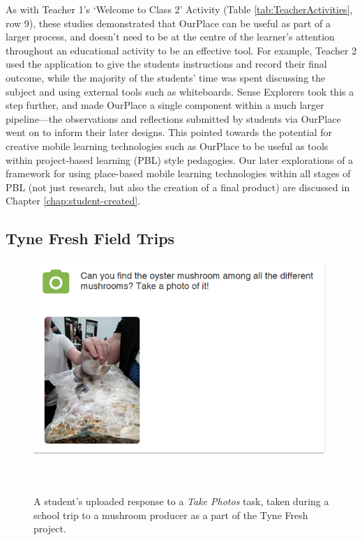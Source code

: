 As with Teacher 1's `Welcome to Class 2' Activity (Table \ref{tab:TeacherActivities}, row 9), these studies demonstrated that OurPlace can be useful as part of a larger process, and doesn't need to be at the centre of the learner's attention throughout an educational activity to be an effective tool. For example, Teacher 2 used the application to give the students instructions and record their final outcome, while the majority of the students' time was spent discussing the subject and using external tools such as whiteboards. Sense Explorers took this a step further, and made OurPlace a single component within a much larger pipeline---the observations and reflections submitted by students via OurPlace went on to inform their later designs. This pointed towards the potential for creative mobile learning technologies such as OurPlace to be useful as tools within project-based learning (PBL) style pedagogies. Our later explorations of a framework for using place-based mobile learning technologies within all stages of PBL (not just research, but also the creation of a final product) are discussed in Chapter \ref{chap:student-created}.

\subsection{Tyne Fresh Field Trips}
\label{sec:TyneFresh}

\begin{figure}
  \centering
  \includegraphics[width=0.8\columnwidth]{images/chapter07/mushroom.png}
  \caption[A student's uploaded photo from a visit to a mushroom producer]{A student's uploaded response to a \textit{Take Photos} task, taken during a school trip to a mushroom producer as a part of the Tyne Fresh project.}~\label{fig:MushroomTrip}
\end{figure}

